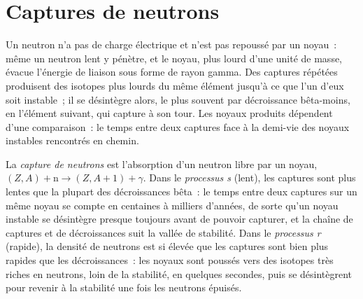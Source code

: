 \section{Captures de neutrons}\label{sec:b3:origin-of-elements:neutrons}

Un neutron n'a pas de charge électrique et n'est pas repoussé par un noyau~: même
un neutron lent y pénètre, et le noyau, plus lourd d'une unité de masse, évacue
l'énergie de liaison sous forme de rayon gamma. Des captures répétées produisent des
isotopes plus lourds du même élément jusqu'à ce que l'un d'eux soit instable~; il se
désintègre alors, le plus souvent par décroissance bêta-moins, en l'élément suivant, qui capture à
son tour. Les noyaux produits dépendent d'une comparaison~: le temps entre
deux captures face à la demi-vie des noyaux instables rencontrés en
chemin.

\begin{definition}\label{def:b3:origin-of-elements:s-process}
La \emph{capture de neutrons} est l'absorption d'un
neutron libre par un noyau, $(Z, A) + \mathrm{n} \to (Z, A+1) + \gamma$.
Dans le \emph{processus s} (lent), les captures
sont plus lentes que la plupart des décroissances bêta~: le temps entre deux captures sur un même
noyau se compte en centaines à milliers d'années, de sorte qu'un noyau instable
se désintègre presque toujours avant de pouvoir capturer, et la chaîne de captures
et de décroissances suit la vallée de stabilité. Dans le
\emph{processus r} (rapide), la densité de neutrons est
si élevée que les captures sont bien plus rapides que les décroissances~: les noyaux sont
poussés vers des isotopes très riches en neutrons, loin de la stabilité, en quelques
secondes, puis se désintègrent pour revenir à la stabilité une fois les neutrons épuisés.
\end{definition}

